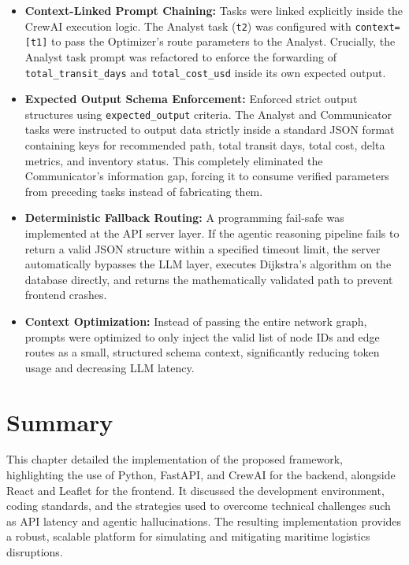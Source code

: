 \begin{itemize}
    \item \textbf{Context-Linked Prompt Chaining:}
    Tasks were linked explicitly inside the CrewAI execution logic. The Analyst task (\texttt{t2}) was configured with \texttt{context=[t1]} to pass the Optimizer's route parameters to the Analyst. Crucially, the Analyst task prompt was refactored to enforce the forwarding of \texttt{total\_transit\_days} and \texttt{total\_cost\_usd} inside its own expected output.

    \item \textbf{Expected Output Schema Enforcement:}
    Enforced strict output structures using \texttt{expected\_output} criteria. The Analyst and Communicator tasks were instructed to output data strictly inside a standard JSON format containing keys for recommended path, total transit days, total cost, delta metrics, and inventory status. This completely eliminated the Communicator's information gap, forcing it to consume verified parameters from preceding tasks instead of fabricating them.

    \item \textbf{Deterministic Fallback Routing:}
    A programming fail-safe was implemented at the API server layer. If the agentic reasoning pipeline fails to return a valid JSON structure within a specified timeout limit, the server automatically bypasses the LLM layer, executes Dijkstra's algorithm on the database directly, and returns the mathematically validated path to prevent frontend crashes.

    \item \textbf{Context Optimization:}
    Instead of passing the entire network graph, prompts were optimized to only inject the valid list of node IDs and edge routes as a small, structured schema context, significantly reducing token usage and decreasing LLM latency.
\end{itemize}
\section[Summary]{Summary}
This chapter detailed the implementation of the proposed framework, highlighting the use of Python, FastAPI, and CrewAI for the backend, alongside React and Leaflet for the frontend. It discussed the development environment, coding standards, and the strategies used to overcome technical challenges such as API latency and agentic hallucinations. The resulting implementation provides a robust, scalable platform for simulating and mitigating maritime logistics disruptions.










